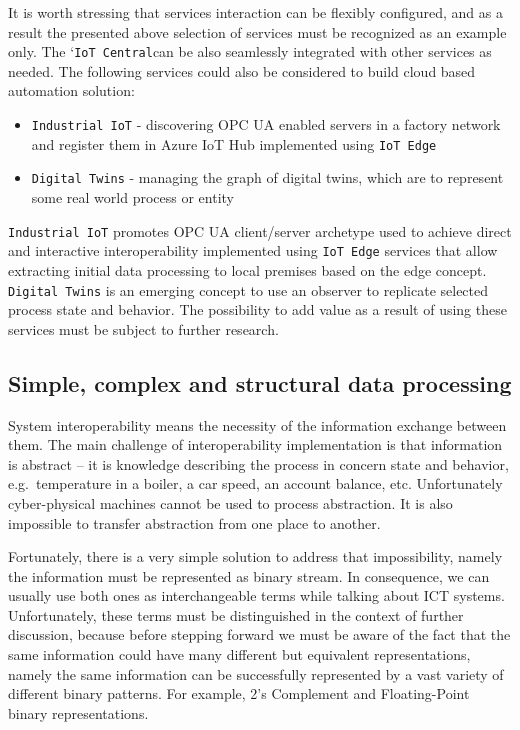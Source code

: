 \documentclass[
]{article}
\providecommand{\tightlist}{%
  \setlength{\itemsep}{0pt}\setlength{\parskip}{0pt}}
\begin{document}
It is worth stressing that services interaction can be flexibly
configured, and as a result the presented above selection of services
must be recognized as an example only. The `\texttt{IoT\ Central}can be
also seamlessly integrated with other services as needed. The following
services could also be considered to build cloud based automation
solution:

\begin{itemize}
\tightlist
\item
  \texttt{Industrial\ IoT} - discovering OPC UA enabled servers in a
  factory network and register them in Azure IoT Hub implemented using
  \texttt{IoT\ Edge}
\item
  \texttt{Digital\ Twins} - managing the graph of digital twins, which
  are to represent some real world process or entity
\end{itemize}

\texttt{Industrial\ IoT} promotes OPC UA client/server archetype used to
achieve direct and interactive interoperability implemented using
\texttt{IoT\ Edge} services that allow extracting initial data
processing to local premises based on the edge concept.
\texttt{Digital\ Twins} is an emerging concept to use an observer to
replicate selected process state and behavior. The possibility to add
value as a result of using these services must be subject to further
research.

\hypertarget{simple-complex-and-structural-data-processing}{%
\subsection{Simple, complex and structural data
processing}\label{simple-complex-and-structural-data-processing}}

System interoperability means the necessity of the information exchange
between them. The main challenge of interoperability implementation is
that information is abstract -- it is knowledge describing the process
in concern state and behavior, e.g.~temperature in a boiler, a car
speed, an account balance, etc. Unfortunately cyber-physical machines
cannot be used to process abstraction. It is also impossible to transfer
abstraction from one place to another.

Fortunately, there is a very simple solution to address that
impossibility, namely the information must be represented as binary
stream. In consequence, we can usually use both ones as interchangeable
terms while talking about ICT systems. Unfortunately, these terms must
be distinguished in the context of further discussion, because before
stepping forward we must be aware of the fact that the same information
could have many different but equivalent representations, namely the
same information can be successfully represented by a vast variety of
different binary patterns. For example, 2's Complement and
Floating-Point binary representations.
\end{document}
